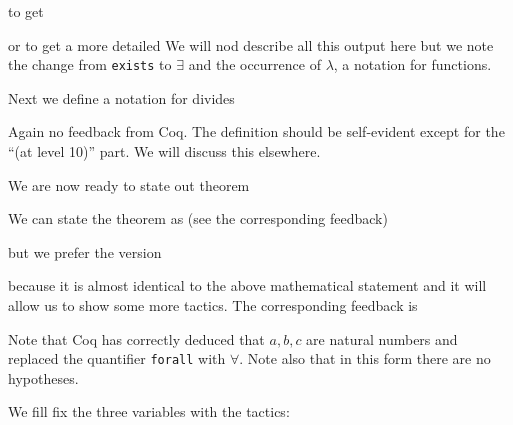 to get

     
or
to get a more detailed 
We will nod describe all this output here but we note the change from \texttt{exists} to $\exists$ and the occurrence of $\lambda$, a notation for functions.


Next we define a notation for divides


Again no feedback from Coq. The definition should be self-evident except for the ``(at level 10)'' part. We will discuss this elsewhere.

We are now ready to state out theorem

We can state the theorem as (see the corresponding feedback)


but we prefer the version

because it is  almost identical to the above mathematical statement and it will allow us to show some more tactics. The corresponding feedback is

Note that Coq has correctly deduced that $a, b, c$ are natural numbers and replaced the quantifier \texttt{forall} with $\forall$. Note also that in this form there are no hypotheses.

We fill fix the three variables with the tactics:

